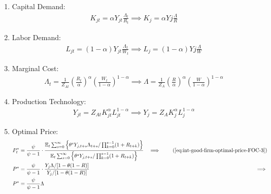 \documentclass[
	thesis.tex
	]{subfiles}
\begin{document}
\begin{enumerate}
	\item Capital Demand:
	\begin{align}
		\label{eq:ss-int-good-firm-FOC-Kt}
		K_{jt} = \alpha Y_{jt} \frac{\Lambda_t}{R_t} \implies 
		K_{j} = \alpha Y{j} \frac{\Lambda}{R}
	\end{align}
	
	\item Labor Demand:
	\begin{align}
		\label{eq:ss-int-good-firm-FOC-Lt}
		L_{jt} = (1-\alpha) Y_{jt} \frac{\Lambda_t}{W_t} \implies 
		L_{j} = (1-\alpha) Y{j} \frac{\Lambda}{W}
	\end{align}
	
	
	\item Marginal Cost:
	\begin{align}
		\label{eq:ss-int-good-firm-MC-2}
		\Lambda_t = \frac{1}{Z_{At}} \left( \frac{R_t}{\alpha} \right)^{\alpha} \left( \frac{W_t}{1-\alpha} \right)^{1-\alpha} \implies
		\Lambda = \frac{1}{Z_{A}} \left( \frac{R}{\alpha} \right)^{\alpha} \left( \frac{W}{1-\alpha} \right)^{1-\alpha}
	\end{align}
	
	\item Production Technology:
	\begin{align}
		\label{eq:ss-int-good-firm-production-function}
		Y_{jt} = Z_{At} K_{jt}^\alpha L_{jt}^{1-\alpha} \implies 
		Y_{j} = Z_{A} K_{j}^\alpha L_{j}^{1-\alpha}
	\end{align}
	
	\item Optimal Price:
	\begin{alignat}{2}
		P_t^\ast &= \frac{\psi}{\psi-1} \cdot \frac{\E \sum_{s=0}^{\infty} \left\{\theta^s Y_{j,t+s} \Lambda_{t+s} / \prod_{k=0}^{s-1}(1+R_{t+k}) \right\}} {\E \sum_{s=0}^{\infty} \left\{ \theta^s Y_{j,t+s} / \prod_{k=0}^{s-1}(1+R_{t+k}) \right\}} &\implies \tag{\ref{eq:int-good-firm-optimal-price-FOC-3}} \\
		P^\ast &= \frac{\psi}{\psi-1} \cdot \frac{ Y_j \Lambda / [1-\theta(1-R)]} {Y_j / [1-\theta(1-R)]} &\implies \nonumber \\
		P^\ast &= \frac{\psi}{\psi-1} \Lambda \label{eq:ss-int-good-firm-optimal-price-FOC-3}
	\end{alignat}
	

\end{enumerate}
\end{document}
